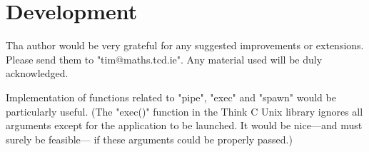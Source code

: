 \section{Development}

Tha author would be very grateful
for any suggested improvements or extensions.
Please send them to "tim@maths.tcd.ie".
Any material used will be duly acknowledged.

Implementation of functions related to 
"pipe", "exec" and "spawn"
would be particularly useful.
(The "exec()" function in the Think C Unix library
ignores all arguments except for the application to be launched.
It would be nice---and must surely be feasible---
if these arguments could be properly passed.)




